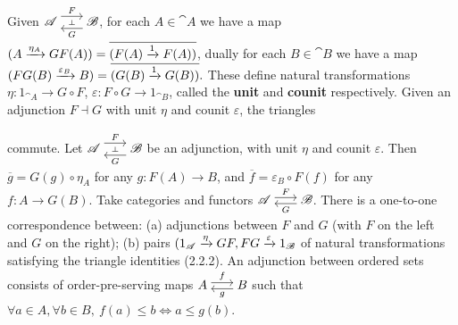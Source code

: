  Given $\cat A \ladj{F}{G} \cat B$, for each $A \in \cat A$ we have a map $(A \xrightarrow[]{\eta_A} GF(A)) = \overline{(F(A) \xrightarrow[]{1} F(A))}$, dually for each $B \in \cat B$ we have a map $(FG(B) \xrightarrow[]{\varepsilon_B} B) = \overline{(G(B) \xrightarrow[]{1} G(B))}.$ These define natural transformations $\eta : 1_{\cat A} \to G \circ F$, $\varepsilon : F \circ G \to 1_{\cat B}$, called the \textbf{unit} and \textbf{counit} respectively.
 Given an adjunction $F \dashv G$ with unit $\eta$ and counit $\varepsilon$, the triangles 
commute.
 Let $\cat A \ladj{F}{G} \cat B$ be an adjunction, with unit $\eta$ and counit $\varepsilon$. Then $\overline{g} = G(g) \circ \eta_A$ for any $g: F(A) \to B$, and $\overline{f} = \varepsilon_B \circ F(f)$ for any $f : A \to G(B)$.
 Take categories and functors $\cat A \isofuncs{F}{G} \cat B$. There is a one-to-one correspondence between: (a) adjunctions between $F$ and $G$ (with $F$ on the left and $G$ on the right); (b) pairs $(1_{\mathscr{A}} \xrightarrow[]{\eta} GF, FG \xrightarrow[]{\varepsilon} 1_{\mathscr{B}}$ of natural transformations satisfying the triangle identities (2.2.2).
 An adjunction between ordered sets consists of order-pre-serving maps $A \isofuncs{f}{g} B$ such that $\forall a \in A, \forall b \in B, \ f(a) \le b \iff a \le g(b)$.